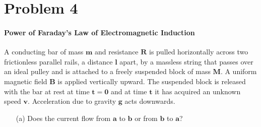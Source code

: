 \documentclass[]{article}
\begin{document}
{	\section*{Problem 4}
		\paragraph{Power of Faraday's Law of Electromagnetic Induction} A conducting bar of mass $\bm{m}$ and resistance $\bm{R}$ is pulled horizontally across two frictionless parallel rails, a distance $\bm{l}$ apart, by a massless string that passes over an ideal pulley and is attached to a freely suspended block of mass $\bm{M}$. A uniform magnetic field $\bm{B}$ is applied vertically upward. The suspended block is released with the bar at rest at time $\bm{t=0}$ and at time $\bm{t}$ it has acquired an unknown speed $\bm{v}$. Acceleration due to gravity $\bm{g}$ acts downwards.
		\begin{enumerate}
			\item[(a)] Does the current flow from $\bm{a}$ to $\bm{b}$ or from $\bm{b}$ to $\bm{a}$?

\end{enumerate}}
\end{document}
